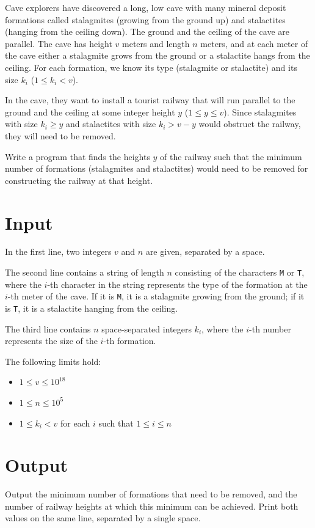 
Cave explorers have discovered a long, low cave with many mineral deposit
formations called stalagmites (growing from the ground up) and stalactites
(hanging from the ceiling down). The ground and the ceiling of the cave are
parallel. The cave has height $v$ meters and length $n$ meters, and at each
meter of the cave either a stalagmite grows from the ground or a stalactite
hangs from the ceiling. For each formation, we know its type (stalagmite or
stalactite) and its size $k_i$ ($1 \leq k_i < v$).

In the cave, they want to install a tourist railway that will run parallel to
the ground and the ceiling at some integer height $y$ ($1 \leq y \leq v$).
Since stalagmites with size $k_i \geq y$ and stalactites with size
$k_i > v - y$ would obstruct the railway, they will need to be removed.

Write a program that finds the heights $y$ of the railway such that the minimum
number of formations (stalagmites and stalactites) would need to be removed for
constructing the railway at that height.

\section*{Input}
In the first line, two integers $v$ and $n$ are given, separated by a space.

The second line contains a string of length $n$ consisting of the characters
\texttt{M} or \texttt{T}, where the $i$-th character in the string represents
the type of the formation at the $i$-th meter of the cave. If it is \texttt{M},
it is a stalagmite growing from the ground; if it is \texttt{T}, it is a
stalactite hanging from the ceiling.

The third line contains $n$ space-separated integers $k_i$, where the $i$-th
number represents the size of the $i$-th formation.

The following limits hold:
\begin{itemize}
  \item $1 \leq v \leq 10^{18}$
  \item $1 \leq n \leq 10^5$
  \item $1 \leq k_i < v$ for each $i$ such that $1 \leq i \leq n$
\end{itemize}

\section*{Output}
Output the minimum number of formations that need to be removed, and the number
of railway heights at which this minimum can be achieved. Print both values on
the same line, separated by a single space.

